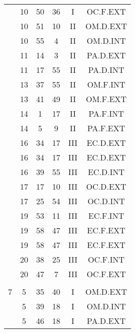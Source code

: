 \documentclass[12pt, a4paper]{article}
\begin{document}
\begin{multicols}{3}
{\begin{tabular}{c c c c c c}
	 	 	 	 & 10 & 50 & 36 & I & OC.F.EXT\\%
	 	 	 	 & 10 & 51 & 10 & II & OM.D.EXT\\%
	 	 	 	 & 10 & 55 & 4 & II & OM.D.INT\\%
	 	 	 	 & 11 & 14 & 3 & II & PA.D.EXT\\%
	 	 	 	 & 11 & 17 & 55 & II & PA.D.INT\\%
	 	 	 	 & 13 & 37 & 55 & II & OM.F.INT\\%
	 	 	 	 & 13 & 41 & 49 & II & OM.F.EXT\\%
	 	 	 	 & 14 & 1 & 17 & II & PA.F.INT\\%
	 	 	 	 & 14 & 5 & 9 & II & PA.F.EXT\\%
	 	 	 	 & 16 & 34 & 17 & III & EC.D.EXT\\%
	 	 	 	 & 16 & 34 & 17 & III & EC.D.EXT\\%
	 	 	 	 & 16 & 39 & 55 & III & EC.D.INT\\%
	 	 	 	 & 17 & 17 & 10 & III & OC.D.EXT\\%
	 	 	 	 & 17 & 25 & 54 & III & OC.D.INT\\%
	 	 	 	 & 19 & 53 & 11 & III & EC.F.INT\\%
	 	 	 	 & 19 & 58 & 47 & III & EC.F.EXT\\%
	 	 	 	 & 19 & 58 & 47 & III & EC.F.EXT\\%
	 	 	 	 & 20 & 38 & 25 & III & OC.F.INT\\%
	 	 	 	 & 20 & 47 & 7 & III & OC.F.EXT\\%
	 	 	 	 & & & & & \\%
	 	 	 	7 & 5 & 35 & 40 & I & OM.D.EXT\\%
	 	 	 	 & 5 & 39 & 18 & I & OM.D.INT\\%
	 	 	 	 & 5 & 46 & 18 & I & PA.D.EXT\\%

\end{tabular}}
\end{multicols}
\end{document}
